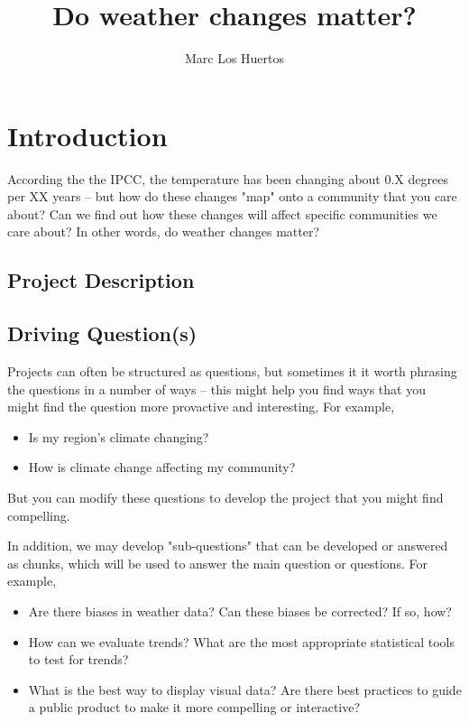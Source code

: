 \documentclass{article}\usepackage[]{graphicx}\usepackage[]{color}
\title{Do weather changes matter?}
\author{Marc Los Huertos}
\begin{document}
\maketitle

\section{Introduction}

According the the IPCC, the temperature has been changing about 0.X degrees per XX years -- but how do these changes "map" onto a community that you care about?  Can we find out how these changes will affect specific communities we care about? In other words, do weather changes matter?

\subsection{Project Description}

\subsection{Driving Question(s)}

Projects can often be structured as questions, but sometimes it it worth phrasing the questions in a number of ways -- this might help you find ways that you might find the question more provactive and interesting, For example,

\begin{itemize}
  \item Is my region's climate changing?
  \item How is climate change affecting my community?
\end{itemize}

But you can modify these questions to develop the project that you might find compelling.

In addition, we may develop "sub-questions" that can be developed or answered as chunks, which will be used to answer the main question or questions. For example, 

\begin{itemize}
  \item Are there biases in weather data? Can these biases be corrected? If so, how?
  \item How can we evaluate trends? What are the most appropriate statistical tools to test for trends?
  \item What is the best way to display visual data?  Are there best practices to guide a public product to make it more compelling or interactive?
\end{itemize}
\end{document}
